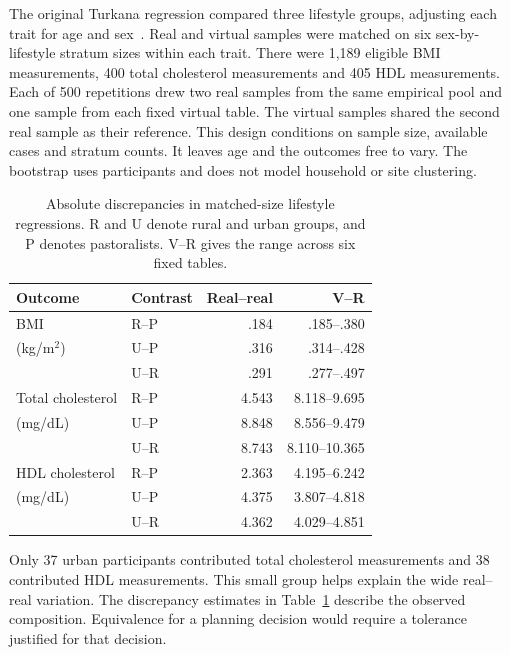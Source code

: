 The original Turkana regression compared three lifestyle groups, adjusting each trait for age and sex~\cite{lea}. Real and virtual samples were matched on six sex-by-lifestyle stratum sizes within each trait. There were 1,189 eligible BMI measurements, 400 total cholesterol measurements and 405 HDL measurements. Each of 500 repetitions drew two real samples from the same empirical pool and one sample from each fixed virtual table. The virtual samples shared the second real sample as their reference. This design conditions on sample size, available cases and stratum counts. It leaves age and the outcomes free to vary. The bootstrap uses participants and does not model household or site clustering.



\begin{table}[t]
\caption{Absolute discrepancies in matched-size lifestyle regressions. R and U denote rural and urban groups, and P denotes pastoralists. V--R gives the range across six fixed tables.}
\label{tab:lifestyle}
\centering
\begin{tabular}{@{}llrr@{}}
\toprule
Outcome & Contrast & Real--real & V--R\\
\midrule
BMI & R--P & .184 & .185--.380\\
(kg/m$^2$) & U--P & .316 & .314--.428\\
 & U--R & .291 & .277--.497\\
\midrule
Total cholesterol & R--P & 4.543 & 8.118--9.695\\
(mg/dL) & U--P & 8.848 & 8.556--9.479\\
 & U--R & 8.743 & 8.110--10.365\\
\midrule
HDL cholesterol & R--P & 2.363 & 4.195--6.242\\
(mg/dL) & U--P & 4.375 & 3.807--4.818\\
 & U--R & 4.362 & 4.029--4.851\\
\bottomrule
\end{tabular}
\end{table}

Only 37 urban participants contributed total cholesterol measurements and 38 contributed HDL measurements. This small group helps explain the wide real--real variation. The discrepancy estimates in Table~\ref{tab:lifestyle} describe the observed composition. Equivalence for a planning decision would require a tolerance justified for that decision.

